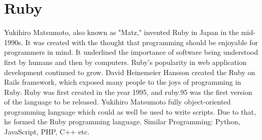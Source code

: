 \documentclass{article}
\begin{document}
    \section*{Ruby}
    Yukihiro Matsumoto, also known as "Matz," invented Ruby in Japan in the   mid-1990s. 
    It was created with the thought that programming should be enjoyable for  programmers in mind. 
    It underlined the importance of software being understood first by humans and then by computers.
    Ruby's popularity in web application development continued to grow. 
    David Heinemeier Hansson created the Ruby on Rails framework, which      exposed many people to the joys of programming in Ruby.
    Ruby was first created in the year 1995, and ruby.95 was the first version of the language to be released.
    Yukihiro Matsumoto fully object-oriented programming language which could as well be used to write scripts. 
    Due to that, he formed the Ruby programming language.
    Similar Programming: Python, JavaScript, PHP, C++ etc.
\end{document}
